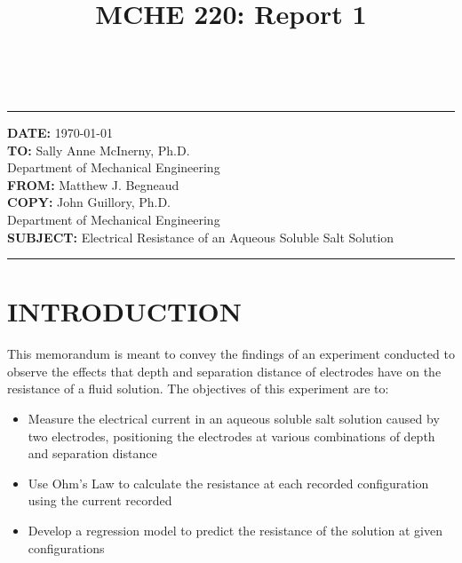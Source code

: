 \documentclass[12pt]{article}
\title{MCHE 220: Report 1}
\begin{document}
\fancyhf{}  
  \renewcommand{\headrulewidth}{0pt}
    \pagestyle{plain}
    
\captionsetup[table]{labelsep=space}

\begin{flushleft}
\hrulefill\\\hrule height 1pt
\vspace{5pt}
\textbf{DATE: }\today
\bigskip\\
\textbf{TO: }Sally Anne McInerny, Ph.D.\\ Department of Mechanical Engineering
\bigskip\\
\textbf{FROM: }Matthew J. Begneaud
\bigskip\\
\textbf{COPY: }John Guillory, Ph.D.\\ Department of Mechanical Engineering
\bigskip\\
\textbf{SUBJECT:} Electrical Resistance of an Aqueous Soluble Salt Solution
\vspace{-10pt}
\end{flushleft}
\hrulefill \hrule height 1pt


\section*{\fontsize{12}{12}\selectfont INTRODUCTION}
This memorandum is meant to convey the findings of an experiment conducted to observe the effects that depth and separation distance of electrodes have on the resistance of a fluid solution. The objectives of this experiment are to:

\begin{itemize}

\item Measure the electrical current in an aqueous soluble salt solution caused by two electrodes, positioning the electrodes at various combinations of depth and separation distance
\item Use Ohm's Law to calculate the resistance at each recorded configuration using the current recorded
\item Develop a regression model to predict the resistance of the solution at given configurations

\end{itemize}
\end{document}
